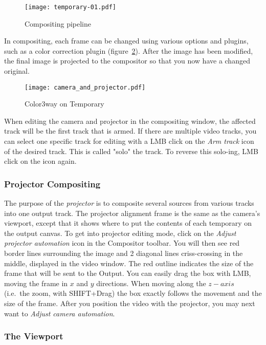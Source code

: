\begin{figure}[htpb]
    \centering
    \texttt{[image: temporary-01.pdf]}
    \caption{Compositing pipeline}
    \label{fig:temporary-01}
\end{figure}

In compositing, each frame can be changed using various options and plugins, such as
a color correction plugin (figure~\ref{fig:camera_and_projector}).  After the image has been
modified, the final image is projected to the compositor so that you now have a changed original.

\begin{figure}[htpb]
    \centering
    \texttt{[image: camera\_and\_projector.pdf]}
    \caption{Color3way on Temporary}
    \label{fig:camera_and_projector}
\end{figure}

When editing the camera and projector in the compositing window, the affected track will be the
first track that is armed.  If there are multiple video tracks, you can select one specific track
for editing with a LMB click on the \textit{Arm track} icon of the desired track. This is called
"solo" the track. To reverse this solo-ing, LMB click on the icon again. 

\subsubsection*{Projector Compositing}%
\label{ssub:projector_compositing}

The purpose of the \textit{projector} is to composite several sources from various tracks into one
output track.  The projector alignment frame is the same as the camera's viewport, except that it
shows where to put the contents of each temporary on the output canvas.  To get into projector
editing mode, click on the \textit{Adjust projector automation} icon in the Compositor toolbar. You
will then see red border lines surrounding the image and 2 diagonal lines criss-crossing in the 
middle, displayed in the video window.  The red outline indicates the size of the frame that will be
sent to the Output. You can easily drag the box with LMB, moving the frame in $x$ and $y$ directions.
When moving along the $z-axis$ (i.e.\ the zoom, with SHIFT+Drag) the box exactly follows the movement
and the size of the frame. After you position the video with the projector, you may next want to
\textit{Adjust camera automation}.

\subsubsection*{The Viewport}%
\label{ssub:viewport}

